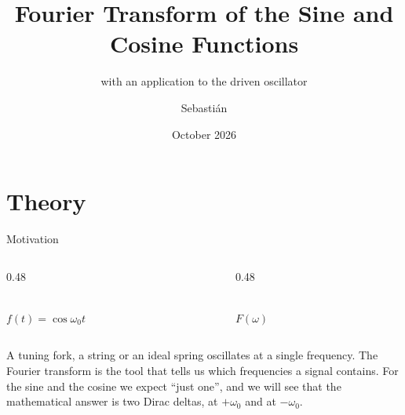 \documentclass[11pt,aspectratio=169]{beamer}
\title[Fourier transform of sine and cosine]{Fourier Transform of the Sine and Cosine Functions}
\subtitle{with an application to the driven oscillator}
\author[Sebastián]{Sebastián}
\institute[UniPamplona]{Physics Program\\Universidad de Pamplona}
\date{October 2026}
\begin{document}
\begin{frame}
  \titlepage
\end{frame}

\section{Theory}

\begin{frame}{Motivation}
  \begin{columns}[c]
    \begin{column}{0.48\textwidth}
      \centering
      \\
      $f(t)=\cos\omega_0 t$
    \end{column}
    \begin{column}{0.48\textwidth}
      \centering
      \\[2mm]
      $F(\omega)$
    \end{column}
  \end{columns}
  \vspace{5mm}
  A tuning fork, a string or an ideal spring oscillates at a single frequency.
  The Fourier transform is the tool that tells us which frequencies a signal contains.
  For the sine and the cosine we expect ``just one'', and we will see that the
  mathematical answer is two Dirac deltas, at $+\omega_0$ and at $-\omega_0$.
\end{frame}
\end{document}
